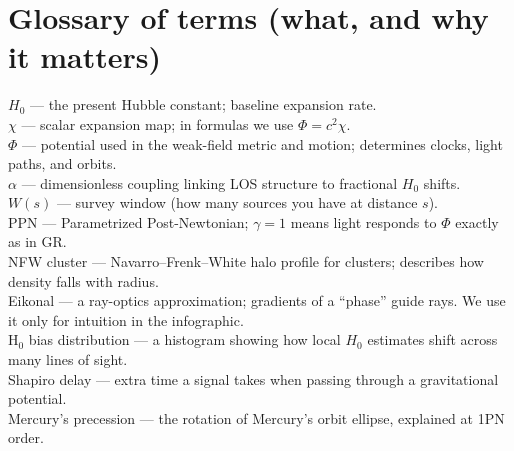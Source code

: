 \documentclass[11pt]{article}
\begin{document}
\section*{Glossary of terms (what, and why it matters)}
$H_0$ — the present Hubble constant; baseline expansion rate.\\
$\chi$ — scalar expansion map; in formulas we use $\Phi=c^{2}\chi$.\\
$\Phi$ — potential used in the weak-field metric and motion; determines clocks, light paths, and orbits.\\
$\alpha$ — dimensionless coupling linking LOS structure to fractional $H_0$ shifts.\\
$W(s)$ — survey window (how many sources you have at distance $s$).\\
PPN — Parametrized Post-Newtonian; $\gamma=1$ means light responds to $\Phi$ exactly as in GR.\\
NFW cluster — Navarro–Frenk–White halo profile for clusters; describes how density falls with radius.\\
Eikonal — a ray-optics approximation; gradients of a “phase” guide rays. We use it only for intuition in the infographic.\\
H$_0$ bias distribution — a histogram showing how local $H_0$ estimates shift across many lines of sight.\\
Shapiro delay — extra time a signal takes when passing through a gravitational potential.\\
Mercury’s precession — the rotation of Mercury’s orbit ellipse, explained at 1PN order.
\end{document}

